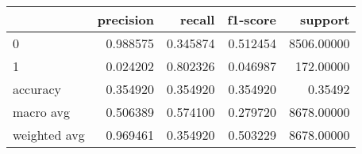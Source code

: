 \begin{tabular}{lrrrr}
\toprule
{} &  precision &    recall &  f1-score &     support \\
\midrule
0            &   0.988575 &  0.345874 &  0.512454 &  8506.00000 \\
1            &   0.024202 &  0.802326 &  0.046987 &   172.00000 \\
accuracy     &   0.354920 &  0.354920 &  0.354920 &     0.35492 \\
macro avg    &   0.506389 &  0.574100 &  0.279720 &  8678.00000 \\
weighted avg &   0.969461 &  0.354920 &  0.503229 &  8678.00000 \\
\bottomrule
\end{tabular}
